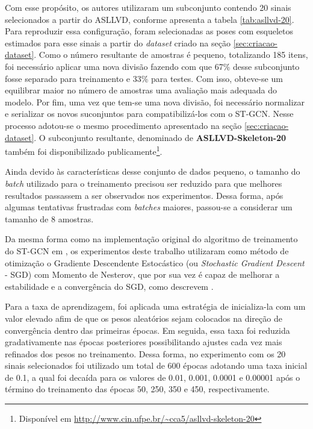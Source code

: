 Com esse propósito, os autores utilizaram um subconjunto contendo 20 sinais selecionados a partir do ASLLVD, conforme apresenta a tabela \ref{tab:asllvd-20}. Para reproduzir essa configuração, foram selecionadas as poses com esqueletos estimados para esse sinais a partir do \textit{dataset} criado na seção \ref{sec:criacao-dataset}. Como o número resultante de amostras é pequeno, totalizando 185 itens, foi necessário aplicar uma nova divisão fazendo com que 67\% desse subconjunto fosse separado para treinamento e 33\% para testes. Com isso, obteve-se um equilibrar maior no número de amostras uma avaliação mais adequada do modelo. Por fim, uma vez que tem-se uma nova divisão, foi necessário normalizar e serializar os novos suconjuntos para compatibilizá-los com o ST-GCN. Nesse processo adotou-se o mesmo procedimento apresentado na seção \ref{sec:criacao-dataset}. O subconjunto resultante, denominado de \textbf{ASLLVD-Skeleton-20} também foi disponibilizado publicamente\footnote{
    Disponível em \url{http://www.cin.ufpe.br/~cca5/asllvd-skeleton-20}
}.

Ainda devido às características desse conjunto de dados pequeno, o tamanho do \textit{batch} utilizado para o treinamento precisou ser reduzido para que melhores resultados passassem a ser observados nos experimentos. Dessa forma, após algumas tentativas frustradas com \textit{batches} maiores, passou-se a considerar um tamanho de 8 amostras.

Da mesma forma como na implementação original do algoritmo de treinamento do ST-GCN em \cite{st-gcn-2018}, os experimentos deste trabalho utilizaram como método de otimização o Gradiente Descendente Estocástico (ou \textit{Stochastic Gradient Descent} - SGD) com Momento de Nesterov, que por sua vez é capaz de melhorar a estabilidade e a convergência do SGD, como descrevem \cite{stanford-2018, bengio-2013, sutskever-2013}.

Para a taxa de aprendizagem, foi aplicada uma estratégia de inicializa-la com um valor elevado afim de que os pesos aleatórios sejam colocados na direção de convergência dentro das primeiras épocas. Em seguida, essa taxa foi reduzida gradativamente nas épocas posteriores possibilitando ajustes cada vez mais refinados dos pesos no treinamento. Dessa forma, no experimento com os 20 sinais selecionados foi utilizado um total de 600 épocas adotando uma taxa inicial de 0.1, a qual foi decaída para os valores de 0.01, 0.001, 0.0001 e 0.00001 após o término do treinamento das épocas 50, 250, 350 e 450, respectivamente.

